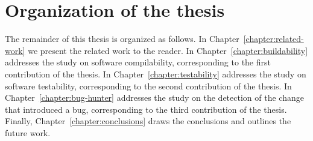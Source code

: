 \section{Organization of the thesis}

The remainder of this thesis is organized as follows.
In Chapter~\ref{chapter:related-work} we present the related work to the reader. 
In Chapter~\ref{chapter:buildability} addresses the study on software compilability, corresponding to the first contribution of the thesis.
In Chapter~\ref{chapter:testability} addresses the study on software testability, corresponding to the second contribution of the thesis.
In Chapter~\ref{chapter:bug-hunter} addresses the study on the detection of the change that introduced a bug, corresponding to the third contribution of the thesis.
Finally, Chapter~\ref{chapter:conclusions} draws the conclusions and outlines the future work.
